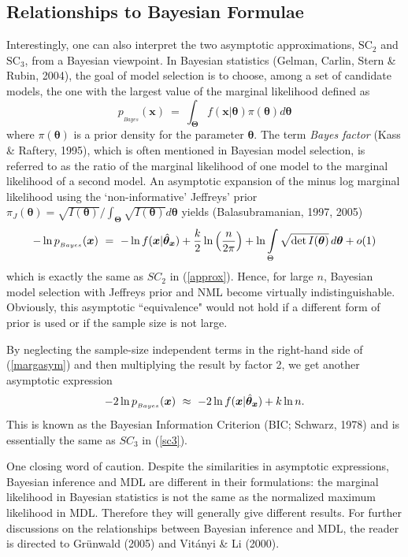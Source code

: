 \documentclass{elsart}
\begin{document}
\subsection{Relationships to Bayesian Formulae}
Interestingly, one can also interpret the two asymptotic approximations, $\mbox{SC}_2$ and
$\mbox{SC}_3$, from a Bayesian viewpoint. In Bayesian statistics (Gelman, Carlin, Stern \& Rubin,
2004), the goal of model selection is to choose, among a set of candidate models, the one with the
largest value of the marginal likelihood defined as
\begin{equation}\label{marginal}
p_{_{Bayes}}(\bm x)~=~\int_{\bm\Theta} f(\bm x|\bm \theta) \pi(\bm \theta) d\bm \theta
\end{equation}
where $\pi(\bm\theta)$ is a prior density for the parameter $\bm\theta$. The term {\it Bayes
factor} (Kass \& Raftery, 1995), which is often mentioned in Bayesian model selection, is referred
to as the ratio of the marginal likelihood of one model to the marginal likelihood of a second
model. An asymptotic expansion of the minus log marginal likelihood using the `non-informative'
Jeffreys' prior $\pi_J (\bm\theta) = \sqrt{I(\bm\theta)} / \int_{\bm\Theta} \sqrt{I(\bm\theta)}
d\bm\theta$ yields (Balasubramanian, 1997, 2005)
\begin{equation}\label{margasym}
- \ln p_{_{Bayes}}(\bm x) ~ =~   -\ln f(\bm{x}|\hat{\bm{\theta}}_{\bm{x}}) + \frac{k}{2} \ln
\left(\frac{n}{2\pi} \right) + \ln \int_{\Theta} \sqrt{\det I(\bm{\theta})} \, d\bm{\theta} + o(1)\\
\end{equation}
which is exactly the same as $SC_2$ in (\ref{approx}). Hence, for large $n$, Bayesian model
selection with Jeffreys prior and NML become virtually indistinguishable. Obviously, this
asymptotic ``equivalence" would not hold if a different form of prior is used or if the sample
size is not large.


By neglecting the sample-size independent terms in the right-hand side of (\ref{margasym}) and
then multiplying the result by factor 2, we get another asymptotic expression
\begin{equation}\label{bic}
- 2\ln p_{_{Bayes}}(\bm x) ~ \approx~   -2\ln f(\bm{x}|\hat{\bm{\theta}}_{\bm{x}}) + k \ln n. \\
\end{equation}
This is known as the Bayesian Information Criterion (BIC; Schwarz, 1978) and is essentially the
same as $SC_3$ in (\ref{sc3}).


One closing word of caution. Despite the similarities in asymptotic expressions, Bayesian
inference and MDL are different in their formulations: the marginal likelihood in Bayesian
statistics is not the same as the normalized maximum likelihood in MDL. Therefore they will
generally give different results. For further discussions on the relationships between Bayesian
inference and MDL, the reader is directed to Gr\"{u}nwald (2005) and Vit\'{a}nyi \& Li (2000).
\end{document}
